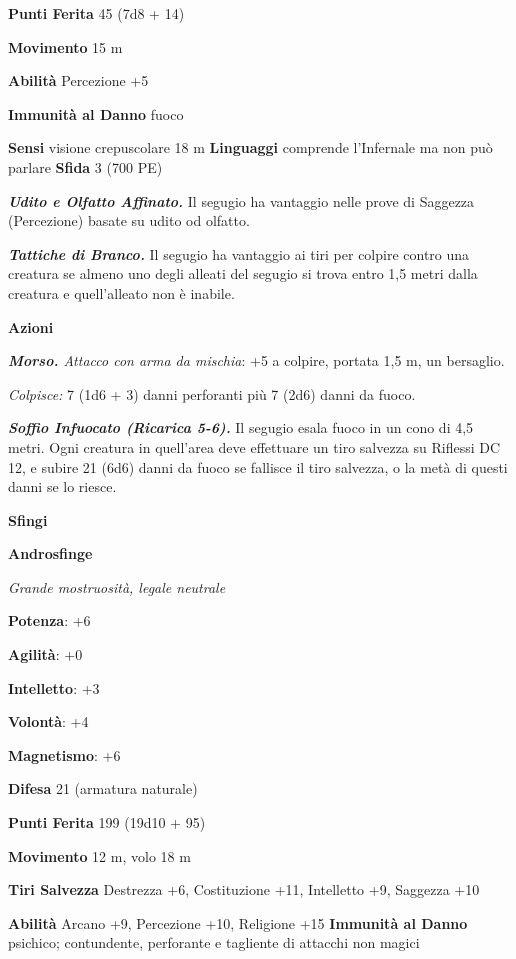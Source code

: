 \begin{multicols}{2}
\textbf{Punti Ferita} 45 (7d8 + 14)

\textbf{Movimento} 15 m

\textbf{Abilità} Percezione +5

\textbf{Immunità al Danno} fuoco

\textbf{Sensi} visione crepuscolare 18 m
\textbf{Linguaggi} comprende l'Infernale ma non può parlare
\textbf{Sfida} 3 (700 PE)

\emph{\textbf{Udito e Olfatto Affinato.}} Il segugio ha vantaggio nelle
prove di Saggezza (Percezione) basate su udito od olfatto.

\emph{\textbf{Tattiche di Branco.}} Il segugio ha vantaggio ai tiri per
colpire contro una creatura se almeno uno degli alleati del segugio si
trova entro 1,5 metri dalla creatura e quell'alleato non è inabile.

\textbf{Azioni}

\emph{\textbf{Morso.} Attacco con arma da mischia}: +5 a colpire,
portata 1,5 m, un bersaglio.

\emph{Colpisce:} 7 (1d6 + 3) danni perforanti più 7 (2d6) danni da
fuoco.

\emph{\textbf{Soffio Infuocato (Ricarica 5-6).}} Il segugio esala fuoco
in un cono di 4,5 metri. Ogni creatura in quell'area deve effettuare un
tiro salvezza su Riflessi DC 12, e subire 21 (6d6) danni da fuoco se
fallisce il tiro salvezza, o la metà di questi danni se lo riesce.



\textbf{Sfingi}

\textbf{Androsfinge}

\emph{Grande mostruosità, legale neutrale}

\textbf{Potenza}: +6

\textbf{Agilità}: +0

\textbf{Intelletto}: +3

\textbf{Volontà}: +4

\textbf{Magnetismo}: +6

\textbf{Difesa} 21 (armatura naturale)

\textbf{Punti Ferita} 199 (19d10 + 95)

\textbf{Movimento} 12 m, volo 18 m

\textbf{Tiri Salvezza} Destrezza +6, Costituzione +11, Intelletto +9,
Saggezza +10

\textbf{Abilità} Arcano +9, Percezione +10, Religione +15
\textbf{Immunità al Danno} psichico; contundente, perforante e tagliente
di attacchi non magici


\end{multicols}
